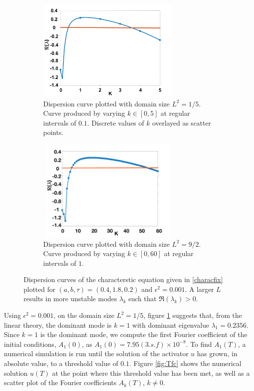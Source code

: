 \begin{figure}[H]
    \centering
    \begin{subfigure}[t]{0.45\textwidth}
        \centering
        \includegraphics[width=7cm,height=5cm]{compdisp1.png}
        \caption{Dispersion curve plotted with domain size $L^2=1/5$. Curve produced by varying $k\in[0,5]$ at regular intervals of $0.1$. Discrete values of $k$ overlayed as scatter points. }
        \label{fig:compdisp1}
    \end{subfigure}
    \hfill
    \begin{subfigure}[t]{0.45\textwidth}
        \centering
        \includegraphics[width=7cm,height=5cm]{compdisp2.png}
        \caption{Dispersion curve plotted with domain size $L^2=9/2$. Curve produced by varying $k\in[0,60]$ at regular intervals of $1$.}
        \label{fig:compdisp2}
    \end{subfigure}
    \caption{Dispersion curves of the characterstic equation given in \eqref{characfix} plotted for $(a,b,\tau)=(0.4,1.8,0.2)$ and $\epsilon^2=0.001$. A larger $L$ results in more unstable modes $\lambda_k$ such that $\Re(\lambda_k)>0$. }
    \label{fig:compardisp}
\end{figure}
Using $\epsilon^2=0.001$, on the domain size $L^2=1/5$, figure \ref{fig:compdisp1} suggests that, from the linear theory, the dominant mode is $k=1$ with dominant eigenvalue $\lambda_1=0.2356$. Since $k=1$ is the dominant mode, we compute the first Fourier coefficient of the initial conditions, $A_1(0)$, as $A_1(0)=7.95(3.s.f)\times10^{-8}$. To find $A_1(T)$, a numerical simulation is run until the solution of the activator $u$ has grown, in absolute value, to a threshold value of $0.1$. Figure \ref{fig:Tfc} shows the numerical solution $u(T)$ at the point where this threshold value has been met, as well as a scatter plot of the Fourier coefficients $A_k(T)$, $k\neq0$.
